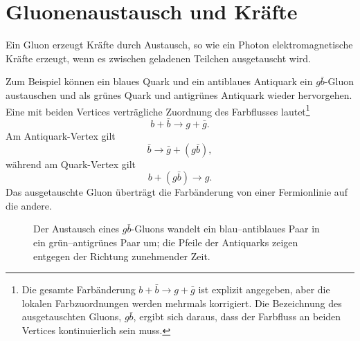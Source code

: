 \section{Gluonenaustausch und Kräfte}

Ein Gluon erzeugt Kräfte durch Austausch, so wie ein Photon elektromagnetische Kräfte erzeugt, wenn es zwischen geladenen Teilchen ausgetauscht wird.

Zum Beispiel können ein blaues Quark und ein antiblaues Antiquark ein \(g\bar b\)-Gluon austauschen und als grünes Quark und antigrünes Antiquark wieder hervorgehen. Eine mit beiden Vertices verträgliche Zuordnung des Farbflusses lautet\footnote{Die gesamte Farbänderung \(b+\bar b\longrightarrow g+\bar g\) ist explizit angegeben, aber die lokalen Farbzuordnungen werden mehrmals korrigiert. Die Bezeichnung des ausgetauschten Gluons, \(g\bar b\), ergibt sich daraus, dass der Farbfluss an beiden Vertices kontinuierlich sein muss.}
\begin{equation}
b+\bar b
\longrightarrow
g+\bar g.
\end{equation}
Am Antiquark-Vertex gilt
\begin{equation}
\bar b\longrightarrow\bar g+(g\bar b),
\end{equation}
während am Quark-Vertex gilt
\begin{equation}
b+(g\bar b)\longrightarrow g.
\end{equation}
Das ausgetauschte Gluon überträgt die Farbänderung von einer Fermionlinie auf die andere.

\begin{figure}[h]
\centering
{}
\caption{Der Austausch eines \(g\bar b\)-Gluons wandelt ein blau--antiblaues Paar in ein grün--antigrünes Paar um; die Pfeile der Antiquarks zeigen entgegen der Richtung zunehmender Zeit.}
\end{figure}


